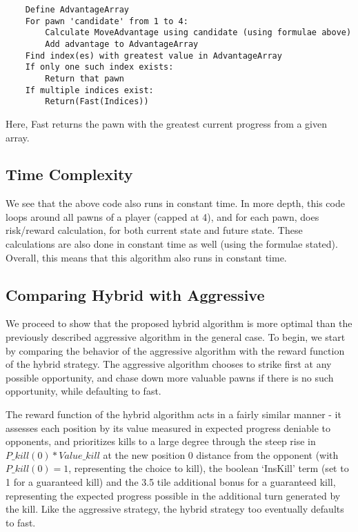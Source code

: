 \documentclass{article} %
\begin{document}
\begin{verbatim}
	Define AdvantageArray
	For pawn 'candidate' from 1 to 4:
		Calculate MoveAdvantage using candidate (using formulae above)
		Add advantage to AdvantageArray
	Find index(es) with greatest value in AdvantageArray
	If only one such index exists:
		Return that pawn
	If multiple indices exist:
		Return(Fast(Indices))
\end{verbatim}
Here, Fast returns the pawn with the greatest current progress from a given array.

\subsection{Time Complexity}
We see that the above code also runs in constant time. In more depth, this code loops	
around all pawns of a player (capped at 4), and for each pawn, does risk/reward calculation, for both current state and future state. These calculations are also done in constant time as well (using the formulae stated). Overall, this means that this algorithm also runs in constant time.


\subsection{Comparing Hybrid with Aggressive}

We proceed to show that the proposed hybrid algorithm is more optimal than the previously described aggressive algorithm in the general case. To begin, we start by comparing the behavior of the aggressive algorithm with the reward function of the hybrid strategy. The aggressive algorithm chooses to strike first at any possible opportunity, and chase down more valuable pawns if there is no such opportunity, while defaulting to fast.

The reward function of the hybrid algorithm acts in a fairly similar manner - it assesses each position by its value measured in expected progress deniable to opponents, and prioritizes kills to a large degree through the steep rise in $P\_kill(0)*Value\_kill$ at the new position 0 distance from the opponent (with $P\_kill(0) = 1$, representing the choice to kill), the boolean ‘InsKill’ term (set to 1 for a guaranteed kill) and the 3.5 tile additional bonus for a guaranteed kill, representing the expected progress possible in the additional turn generated by the kill. Like the aggressive strategy, the hybrid strategy too eventually defaults to fast.
\end{document}
